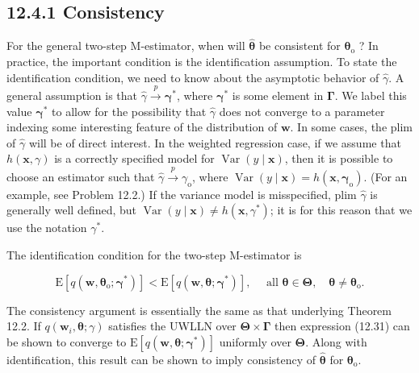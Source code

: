 \documentclass[10pt]{article}
\begin{document}
\subsection*{12.4.1 Consistency}
For the general two-step M-estimator, when will $\hat{\boldsymbol{\theta}}$ be consistent for $\boldsymbol{\theta}_{\mathrm{o}}$ ? In practice, the important condition is the identification assumption. To state the identification condition, we need to know about the asymptotic behavior of $\hat{\gamma}$. A general assumption is that $\hat{\gamma} \xrightarrow{p} \boldsymbol{\gamma}^{*}$, where $\boldsymbol{\gamma}^{*}$ is some element in $\boldsymbol{\Gamma}$. We label this value $\boldsymbol{\gamma}^{*}$ to allow for the possibility that $\hat{\gamma}$ does not converge to a parameter indexing some interesting feature of the distribution of $\mathbf{w}$. In some cases, the plim of $\hat{\gamma}$ will be of direct interest. In the weighted regression case, if we assume that $h(\mathbf{x}, \gamma)$ is a correctly specified model for $\operatorname{Var}(y \mid \mathbf{x})$, then it is possible to choose an estimator such that $\hat{\gamma} \xrightarrow{p} \gamma_{\mathrm{o}}$, where $\operatorname{Var}(y \mid \mathbf{x})=h\left(\mathbf{x}, \boldsymbol{\gamma}_{\mathrm{o}}\right)$. (For an example, see Problem 12.2.) If the variance model is misspecified, plim $\hat{\gamma}$ is generally well defined, but $\operatorname{Var}(y \mid \mathbf{x}) \neq h\left(\mathbf{x}, \gamma^{*}\right)$; it is for this reason that we use the notation $\gamma^{*}$.

The identification condition for the two-step M-estimator is

$$
\mathrm{E}\left[q\left(\mathbf{w}, \boldsymbol{\theta}_{\mathrm{o}} ; \boldsymbol{\gamma}^{*}\right)\right]<\mathrm{E}\left[q\left(\mathbf{w}, \boldsymbol{\theta} ; \boldsymbol{\gamma}^{*}\right)\right], \quad \text { all } \boldsymbol{\theta} \in \boldsymbol{\Theta}, \quad \boldsymbol{\theta} \neq \boldsymbol{\theta}_{\mathrm{o}} .
$$

The consistency argument is essentially the same as that underlying Theorem 12.2. If $q\left(\mathbf{w}_{i}, \boldsymbol{\theta} ; \gamma\right)$ satisfies the UWLLN over $\boldsymbol{\Theta} \times \boldsymbol{\Gamma}$ then expression (12.31) can be shown to converge to $\mathrm{E}\left[q\left(\mathbf{w}, \boldsymbol{\theta} ; \boldsymbol{\gamma}^{*}\right)\right]$ uniformly over $\boldsymbol{\Theta}$. Along with identification, this result can be shown to imply consistency of $\hat{\boldsymbol{\theta}}$ for $\boldsymbol{\theta}_{\mathrm{o}}$.
\end{document}
